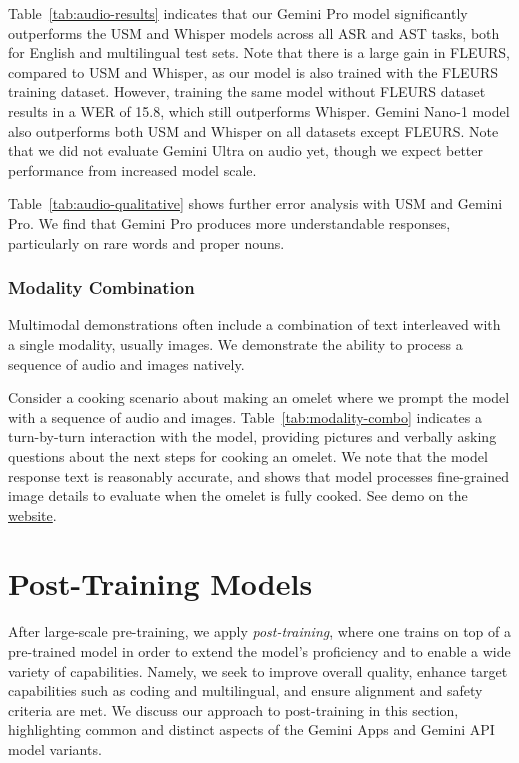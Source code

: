 Table~\ref{tab:audio-results} indicates that our Gemini Pro model significantly outperforms the USM and Whisper models across all ASR and AST tasks, both for English and multilingual test sets. Note that there is a large gain in FLEURS, compared to USM and Whisper, as our model is also trained with the FLEURS training dataset. However, training the same model without FLEURS dataset results in a WER of 15.8, which still outperforms Whisper. Gemini Nano-1 model also outperforms both USM and Whisper on all datasets except FLEURS. Note that we did not evaluate Gemini Ultra on audio yet, though we expect better performance from increased model scale.

Table~\ref{tab:audio-qualitative} shows further error analysis with USM and Gemini Pro. We find that Gemini Pro produces more understandable responses, particularly on rare words and proper nouns.


\subsubsection{Modality Combination} Multimodal demonstrations often include a combination of text interleaved with a single modality, usually images. We demonstrate the ability to process a sequence of audio and images natively. 

Consider a cooking scenario about making an omelet where we prompt the model with a sequence of audio and images. Table~\ref{tab:modality-combo} indicates a turn-by-turn interaction with the model, providing pictures and verbally asking questions about the next steps for cooking an omelet. We note that the model response text is reasonably accurate, and shows that model processes fine-grained image details to evaluate when the omelet is fully cooked. See demo on the \href{https://deepmind.google/gemini}{website}.

\section{Post-Training Models}

\label{sec:post-training}

After large-scale pre-training, we apply \emph{post-training}, where one trains on top of a pre-trained model in order to extend the model’s proficiency and to enable a wide variety of capabilities. Namely, we seek to improve overall quality, enhance target capabilities such as coding and multilingual, and ensure alignment and safety criteria are met. We discuss our approach to post-training in this section, highlighting common and distinct aspects of the Gemini Apps and Gemini API model variants.

